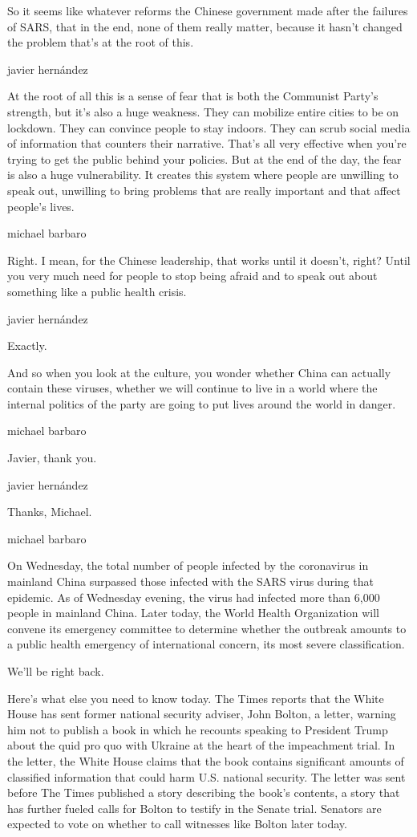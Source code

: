 So it seems like whatever reforms the Chinese government made after the
failures of SARS, that in the end, none of them really matter, because
it hasn't changed the problem that's at the root of this.

javier hernández

At the root of all this is a sense of fear that is both the Communist
Party's strength, but it's also a huge weakness. They can mobilize
entire cities to be on lockdown. They can convince people to stay
indoors. They can scrub social media of information that counters their
narrative. That's all very effective when you're trying to get the
public behind your policies. But at the end of the day, the fear is also
a huge vulnerability. It creates this system where people are unwilling
to speak out, unwilling to bring problems that are really important and
that affect people's lives.

michael barbaro

Right. I mean, for the Chinese leadership, that works until it doesn't,
right? Until you very much need for people to stop being afraid and to
speak out about something like a public health crisis.

javier hernández

Exactly.

And so when you look at the culture, you wonder whether China can
actually contain these viruses, whether we will continue to live in a
world where the internal politics of the party are going to put lives
around the world in danger.

michael barbaro

Javier, thank you.

javier hernández

Thanks, Michael.

michael barbaro

On Wednesday, the total number of people infected by the coronavirus in
mainland China surpassed those infected with the SARS virus during that
epidemic. As of Wednesday evening, the virus had infected more than
6,000 people in mainland China. Later today, the World Health
Organization will convene its emergency committee to determine whether
the outbreak amounts to a public health emergency of international
concern, its most severe classification.

We'll be right back.

Here's what else you need to know today. The Times reports that the
White House has sent former national security adviser, John Bolton, a
letter, warning him not to publish a book in which he recounts speaking
to President Trump about the quid pro quo with Ukraine at the heart of
the impeachment trial. In the letter, the White House claims that the
book contains significant amounts of classified information that could
harm U.S. national security. The letter was sent before The Times
published a story describing the book's contents, a story that has
further fueled calls for Bolton to testify in the Senate trial. Senators
are expected to vote on whether to call witnesses like Bolton later
today.


